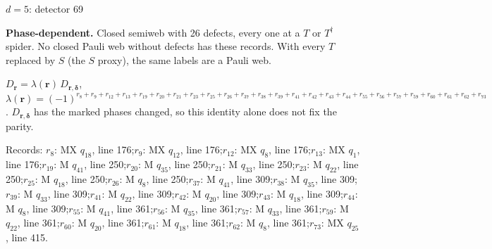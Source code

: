 \label{d5_det069}
{\Large $d=5$: detector 69}\par
\textbf{Phase-dependent.} Closed semiweb with 26 defects, every one at a $T$ or $T^\dagger$ spider. No closed Pauli web without defects has these records. With every $T$ replaced by $S$ (the $S$ proxy), the same labels are a Pauli web.
\begin{center}
\end{center}
\vspace{-1mm}
$D_{\boldsymbol r}=\lambda(\boldsymbol r)\,D_{\boldsymbol r,\boldsymbol\delta}$, \quad $\lambda(\boldsymbol r)=(-1)^{r_{8}+r_{9}+r_{12}+r_{13}+r_{19}+r_{20}+r_{21}+r_{23}+r_{25}+r_{26}+r_{37}+r_{38}+r_{39}+r_{41}+r_{42}+r_{43}+r_{44}+r_{55}+r_{56}+r_{57}+r_{59}+r_{60}+r_{61}+r_{62}+r_{73}}$. \qquad $D_{\boldsymbol r,\boldsymbol\delta}$ has the marked phases changed, so this identity alone does not fix the parity.
\par\smallskip\begin{minipage}{.98\linewidth}\small Records: $r_{8}$: MX $q_{18}$, line 176;\quad $r_{9}$: MX $q_{12}$, line 176;\quad $r_{12}$: MX $q_{8}$, line 176;\quad $r_{13}$: MX $q_{1}$, line 176;\quad $r_{19}$: M $q_{41}$, line 250;\quad $r_{20}$: M $q_{35}$, line 250;\quad $r_{21}$: M $q_{33}$, line 250;\quad $r_{23}$: M $q_{22}$, line 250;\quad $r_{25}$: M $q_{18}$, line 250;\quad $r_{26}$: M $q_{8}$, line 250;\quad $r_{37}$: M $q_{41}$, line 309;\quad $r_{38}$: M $q_{35}$, line 309;\quad $r_{39}$: M $q_{33}$, line 309;\quad $r_{41}$: M $q_{22}$, line 309;\quad $r_{42}$: M $q_{20}$, line 309;\quad $r_{43}$: M $q_{18}$, line 309;\quad $r_{44}$: M $q_{8}$, line 309;\quad $r_{55}$: M $q_{41}$, line 361;\quad $r_{56}$: M $q_{35}$, line 361;\quad $r_{57}$: M $q_{33}$, line 361;\quad $r_{59}$: M $q_{22}$, line 361;\quad $r_{60}$: M $q_{20}$, line 361;\quad $r_{61}$: M $q_{18}$, line 361;\quad $r_{62}$: M $q_{8}$, line 361;\quad $r_{73}$: MX $q_{25}$, line 415.\end{minipage}
